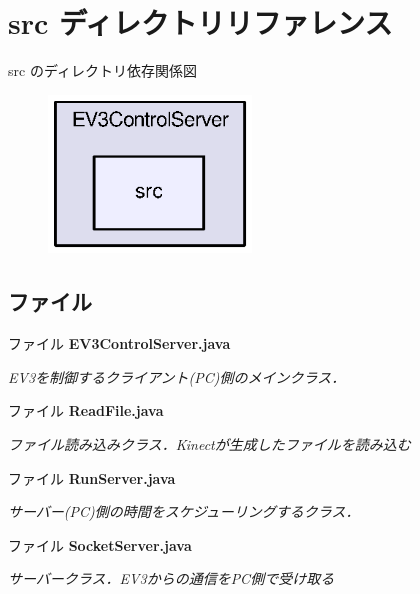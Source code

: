 \section{src ディレクトリリファレンス}
\label{dir_92080cb62ef6ae23298ebcab02ff81af}
src のディレクトリ依存関係図\nopagebreak
\begin{figure}[H]
\begin{center}
\leavevmode
\includegraphics[width=153pt]{dir_92080cb62ef6ae23298ebcab02ff81af_dep}
\end{center}
\end{figure}
\subsection*{ファイル}
\begin{DoxyCompactItemize}
\item 
ファイル {\bf E\-V3\-Control\-Server.\-java}
\begin{DoxyCompactList}\small\item\em E\-V3を制御するクライアント(\-P\-C)側のメインクラス． \end{DoxyCompactList}\item 
ファイル {\bf Read\-File.\-java}
\begin{DoxyCompactList}\small\item\em ファイル読み込みクラス．\-Kinectが生成したファイルを読み込む \end{DoxyCompactList}\item 
ファイル {\bf Run\-Server.\-java}
\begin{DoxyCompactList}\small\item\em サーバー(\-P\-C)側の時間をスケジューリングするクラス． \end{DoxyCompactList}\item 
ファイル {\bf Socket\-Server.\-java}
\begin{DoxyCompactList}\small\item\em サーバークラス．\-E\-V3からの通信を\-P\-C側で受け取る \end{DoxyCompactList}\end{DoxyCompactItemize}
